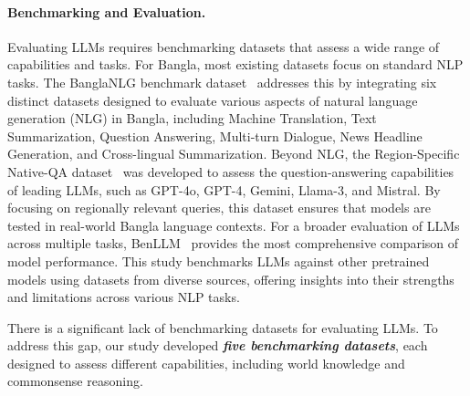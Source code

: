 \paragraph{Benchmarking and Evaluation.}
Evaluating LLMs requires benchmarking datasets that assess a wide range of capabilities and tasks. For Bangla, most existing datasets focus on standard NLP tasks. The BanglaNLG benchmark dataset~\cite{bhattacharjee2023banglanlg} addresses this by integrating six distinct datasets designed to evaluate various aspects of natural language generation (NLG) in Bangla, including Machine Translation, Text Summarization, Question Answering, Multi-turn Dialogue, News Headline Generation, and Cross-lingual Summarization.
Beyond NLG, the Region-Specific Native-QA dataset~\cite{hasan2024nativqa} was developed to assess the question-answering capabilities of leading LLMs, such as GPT-4o, GPT-4, Gemini, Llama-3, and Mistral. By focusing on regionally relevant queries, this dataset ensures that models are tested in real-world Bangla language contexts.
For a broader evaluation of LLMs across multiple tasks, BenLLM~\cite{kabir2024benllm} provides the most comprehensive comparison of model performance. This study benchmarks LLMs against other pretrained models using datasets from diverse sources, offering insights into their strengths and limitations across various NLP tasks.

There is a significant lack of benchmarking datasets for evaluating LLMs. To address this gap, our study developed \textbf{\textit{five benchmarking datasets}}, each designed to assess different capabilities, including world knowledge and commonsense reasoning.





